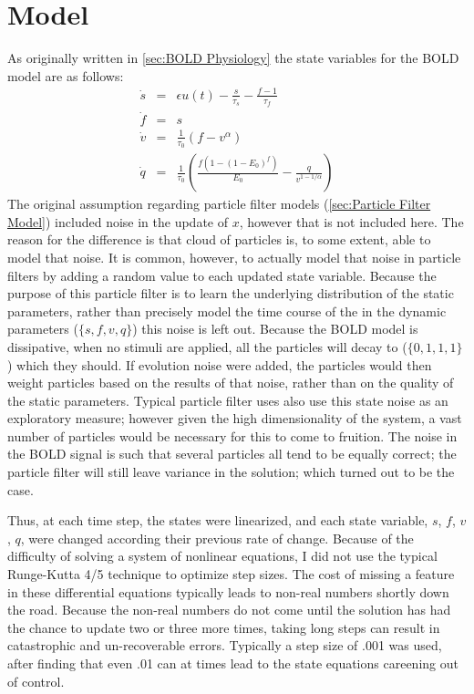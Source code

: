 \section{Model}
As originally written in \autoref{sec:BOLD Physiology} the state variables
for the BOLD model are as follows:
\begin{eqnarray}
\dot{s} &=& \epsilon u(t) - \frac{s}{\tau_s} - \frac{f - 1}{\tau_f} \\
\dot{f} &=& s\\
\dot{v} &=& \frac{1}{\tau_0}(f - v^\alpha)\\
\dot{q} &=& \frac{1}{\tau_0}(\frac{f(1-(1-E_0)^f)}{E_0} - \frac{q}{v^{1-1/\alpha}})
\end{eqnarray}
The original assumption regarding particle filter models (\autoref{sec:Particle Filter Model})
included noise in the update of $x$, however that is not included here.
The reason for the difference is that cloud of particles is, to some extent,
able to model that noise. It is common, however, to actually model that noise
in particle filters by adding a random value to each updated state variable. 
Because the purpose of this particle filter is to learn the underlying distribution
of the static parameters, rather than precisely model the time course of the 
in the dynamic parameters ($\{s,f,v,q\}$) this noise is left out. Because the
BOLD model is dissipative, when no stimuli are applied, all the particles 
will decay to ($\{0,1,1,1\}$) which they should. If evolution noise were added, the 
particles would then weight particles based on the results of that noise, rather
than on the quality of the static parameters. Typical particle filter uses
also use this state noise as an exploratory measure; however given the 
high dimensionality of the system, a vast number of particles would be 
necessary for this to come to fruition. The noise in the BOLD signal is such
that several particles all tend to be equally correct; the particle filter will
still leave variance in the solution; which turned out to be the case.

Thus, at each time step, the states were linearized, and each state variable,
$s$, $f$, $v$, $q$, were changed according their previous rate of change.
Because of the difficulty of solving a system of nonlinear equations, I 
did not use the typical Runge-Kutta 4/5 technique to optimize step sizes. 
The cost of missing a feature in these differential equations typically leads
to non-real numbers shortly down the road. Because the non-real numbers do 
not come until the solution has had the chance to update two or three more
times, taking long steps can result in catastrophic and un-recoverable errors. 
Typically a step size of .001 was used, after finding that even .01 can
at times lead to the state equations careening out of control.

